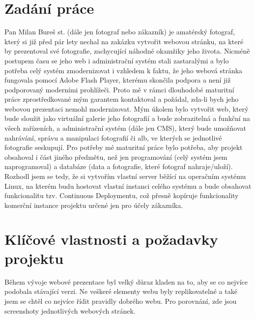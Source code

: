 \documentclass[12pt,a4paper]{report}
\begin{document}
  \chapter{Zadání práce}
  Pan Milan Bureš st. (dále jen fotograf nebo zákazník) je amatérský fotograf, který si již před pár lety
  nechal na zakázku vytvořit webovou stránku, na které by prezentoval své fotografie, zachycující
  náhodné okamžiky jeho života. Nicméně postupem času se jeho web i administrační systém stali
  zastaralými a bylo potřeba celý systém zmodernizovat i vzhledem k faktu, že jeho webová stránka
  fungovala pomocí Adobe Flash Player, kterému skončila podpora a není již podporovaný
  moderními prohlížeči.
  Proto mě v rámci dlouhodobé maturitní práce zprostředkované mým garantem kontaktoval a
  požádal, zda-li bych jeho webovou prezentaci nemohl modernizovat. Mým úkolem bylo vytvořit
  web, který bude sloužit jako virtuální galerie jeho fotografií a bude zobrazitelná a funkční na všech
  zařízeních, a administrační systém (dále jen CMS), který bude umožňovat nahrávání, správu a
  manipulaci fotografií či alb, ve kterých se jednotlivé fotografie seskupují.
  Pro potřeby mé maturitní práce bylo potřeba, aby projekt obsahoval i část jiného předmětu, než
  jen programování (celý systém jsem naprogramoval) a databáze (data a fotografie, které fotograf
  nahraje/uloží). Rozhodl jsem se tedy, že si vytvořím vlastní server běžící na operačním systému
  Linux, na kterém budu hostovat vlastní instanci celého systému a bude obsahovat funkcionalitu
  tzv. Continuous Deploymentu, což přesně kopíruje funkcionality komerční instance projektu určené
  jen pro účely zákazníka.


  \chapter{Klíčové vlastnosti a požadavky projektu}
  Během vývoje webové prezentace byl velký důraz kladen na to, aby se co nejvíce podobala
  stávající verzi. Ne veškeré elementy webu byly replikovatelné a také jsem se chtěl co nejvíce řídit
  pravidly dobrého webu. Pro porovnání, zde jsou screenshoty jednotlivých webových stránek.
  
\end{document}
